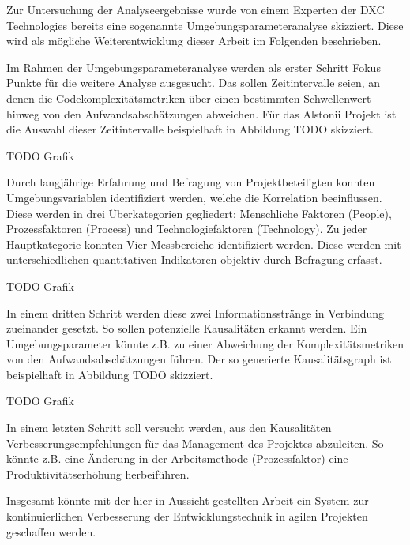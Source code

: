 Zur Untersuchung der Analyseergebnisse wurde von einem Experten der DXC
Technologies bereits eine sogenannte Umgebungsparameteranalyse
skizziert. Diese wird als mögliche Weiterentwicklung dieser Arbeit im
Folgenden beschrieben.

Im Rahmen der Umgebungsparameteranalyse werden als erster Schritt Fokus
Punkte für die weitere Analyse ausgesucht. Das sollen Zeitintervalle
seien, an denen die Codekomplexitätsmetriken über einen bestimmten
Schwellenwert hinweg von den Aufwandsabschätzungen abweichen. Für das
Alstonii Projekt ist die Auswahl dieser Zeitintervalle beispielhaft in
Abbildung TODO skizziert.

TODO Grafik

Durch langjährige Erfahrung und Befragung von Projektbeteiligten konnten
Umgebungsvariablen identifiziert werden, welche die Korrelation
beeinflussen. Diese werden in drei Überkategorien gegliedert:
Menschliche Faktoren (People), Prozessfaktoren (Process) und
Technologiefaktoren (Technology). Zu jeder Hauptkategorie konnten Vier
Messbereiche identifiziert werden. Diese werden mit unterschiedlichen
quantitativen Indikatoren objektiv durch Befragung erfasst.

TODO Grafik

In einem dritten Schritt werden diese zwei Informationsstränge in Verbindung
zueinander gesetzt. So sollen potenzielle Kausalitäten erkannt werden.
Ein Umgebungsparameter könnte z.B. zu einer Abweichung der
Komplexitätsmetriken von den Aufwandsabschätzungen führen. Der so
generierte Kausalitätsgraph ist beispielhaft in Abbildung TODO skizziert.

TODO Grafik

In einem letzten Schritt soll versucht werden, aus den Kausalitäten
Verbesserungsempfehlungen für das Management des Projektes abzuleiten.
So könnte z.B. eine Änderung in der Arbeitsmethode (Prozessfaktor) eine
Produktivitätserhöhung herbeiführen.

Insgesamt könnte mit der hier in Aussicht gestellten Arbeit ein System
zur kontinuierlichen Verbesserung der Entwicklungstechnik in agilen
Projekten geschaffen werden.